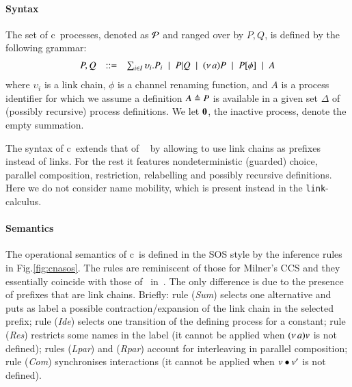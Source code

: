 \paragraph{Syntax}
The set of c\CNA\ processes, denoted as $\cal{P}$ and ranged over by $P,Q$, is defined by the following grammar:
\[
\begin{array}{rcl}
P,Q & ::= &
\sum_{i\in I} \upsilon_i.P_i \;\mid\;
P|Q \;\mid\;
(\nu\, a) P \;\mid\;
P[\phi] \;\mid\;
A
\end{array}
\]
\noindent
where $\upsilon_i$ is a  link chain,
$\phi$ is a channel renaming function,
and $A$ is a process identifier for which we assume a definition $A
\triangleq P$ is available in a given set $\Delta$ of (possibly
recursive) process definitions. We let $\mathbf{0}$, the inactive process,
denote the empty summation.

The syntax of c\CNA\  extends that of \CNA~\cite{BBB17} by allowing to use link chains as prefixes instead of links.
For the rest it features nondeterministic (guarded) choice, parallel composition, restriction, relabelling and possibly recursive definitions. Here we do not consider name mobility, which is present instead in the {\tt link}-calculus.

\paragraph{Semantics}

The operational semantics of c\CNA\ is defined in the SOS style by the inference rules in Fig.\ref{fig:cnasos}. The rules are reminiscent of those for Milner's CCS and they essentially coincide with those of \CNA\ in~\cite{BBB17}. The only difference is due to the presence of prefixes that are link chains.
Briefly: rule (\textit{Sum}) selects one alternative and puts as label a possible contraction/expansion of the link chain in the selected prefix; rule (\textit{Ide}) selects one transition of the defining process for a constant; rule (\textit{Res}) restricts some names in the label (it cannot be applied when $(\nu\, a)v$ is not defined); rules (\textit{Lpar}) and (\textit{Rpar}) account for interleaving in parallel composition; rule (\textit{Com}) 
synchronises interactions (it cannot be applied when $v \bullet v'$ is not defined).


